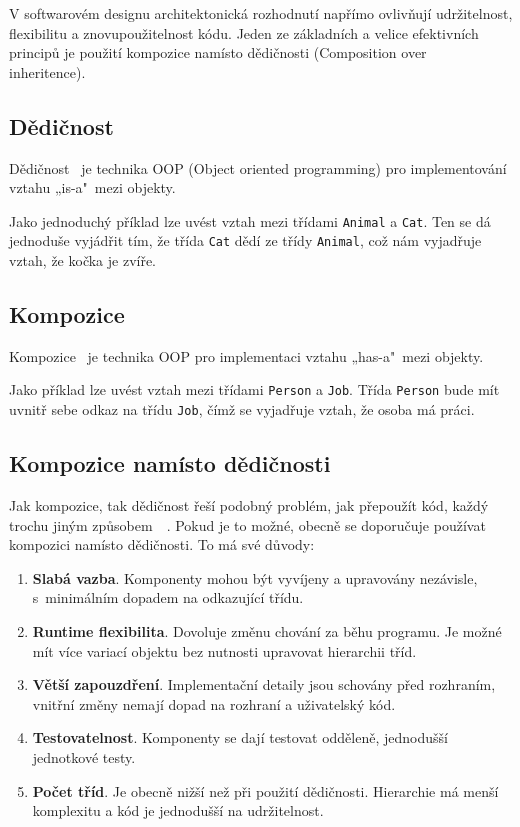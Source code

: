 V softwarovém designu architektonická rozhodnutí napřímo ovlivňují udržitelnost, flexibilitu a znovupoužitelnost kódu. Jeden ze základních a velice efektivních principů je použití kompozice namísto dědičnosti (Composition over inheritence).~\cite{ReusabilityPrinciples}

\subsection{Dědičnost}

Dědičnost~\cite{CompositionInheritence} je technika OOP (Object oriented programming) pro implementování vztahu „is-a"~mezi objekty.

Jako jednoduchý příklad lze uvést vztah mezi třídami \texttt{Animal} a \texttt{Cat}. Ten se dá jednoduše vyjádřit tím, že třída \texttt{Cat} dědí ze třídy \texttt{Animal}, což nám vyjadřuje vztah, že kočka je zvíře.

\subsection{Kompozice}
\label{Composition}

Kompozice~\cite{CompositionInheritence} je technika OOP pro implementaci vztahu „has-a"~mezi objekty.

Jako příklad lze uvést vztah mezi třídami \texttt{Person} a \texttt{Job}. Třída \texttt{Person} bude mít uvnitř sebe odkaz na třídu \texttt{Job}, čímž se vyjadřuje vztah, že osoba má práci.

\subsection{Kompozice namísto dědičnosti}

Jak kompozice, tak dědičnost řeší podobný problém, jak přepoužít kód, každý trochu jiným způsobem~\cite{CompositionInheritence}~\cite{ReusabilityPrinciples}. Pokud je to možné, obecně se doporučuje používat kompozici namísto dědičnosti. To má své důvody:

\begin{enumerate}
    \item \textbf{Slabá vazba}. Komponenty mohou být vyvíjeny a upravovány nezávisle, s~minimálním dopadem na odkazující třídu.
    \item \textbf{Runtime flexibilita}. Dovoluje změnu chování za běhu programu. Je možné mít více variací objektu bez nutnosti upravovat hierarchii tříd.
    \item \textbf{Větší zapouzdření}. Implementační detaily jsou schovány před rozhraním, vnitřní změny nemají dopad na rozhraní a uživatelský kód.
    \item \textbf{Testovatelnost}. Komponenty se dají testovat odděleně, jednodušší jednotkové testy.
    \item \textbf{Počet tříd}. Je obecně nižší než při použití dědičnosti. Hierarchie má menší komplexitu a kód je jednodušší na udržitelnost.
\end{enumerate}

